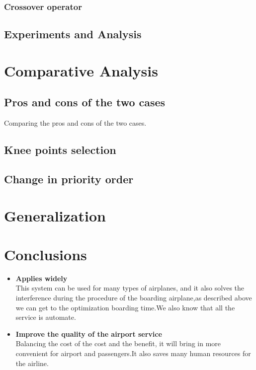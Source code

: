 \documentclass{mcmthesis}
\begin{document}
\subsubsection{Crossover operator}

\subsection{Experiments and Analysis}%




\section{Comparative Analysis}
\subsection{ Pros and cons of the two cases}
Comparing the pros and cons of the two cases.

\subsection{Knee points selection}
\subsection{Change in priority order}




\section{Generalization}


\section{Conclusions}
\begin{itemize}
\item \textbf{Applies widely}\\
This  system can be used for many types of airplanes, and it also
solves the interference during  the procedure of the boarding
airplane,as described above we can get to the  optimization
boarding time.We also know that all the service is automate.
\item \textbf{Improve the quality of the airport service}\\
Balancing the cost of the cost and the benefit, it will bring in
more convenient  for airport and passengers.It also saves many
human resources for the airline.
\end{itemize}
\end{document}
